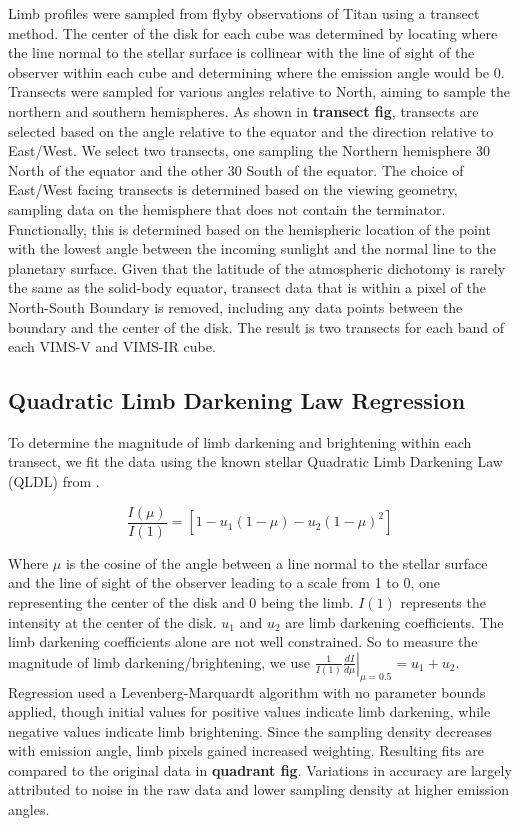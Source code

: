 \documentclass[tighten,linenumbers,twocolumn]{aastex631}
\begin{document}
Limb profiles were sampled from flyby observations of Titan using a transect method. The center of the disk for each cube was determined by locating where the line normal to the stellar surface is collinear with the line of sight of the observer within each cube and determining where the emission angle would be 0. Transects were sampled for various angles relative to North, aiming to sample the northern and southern hemispheres. As shown in \textbf{transect fig}, transects are selected based on the angle relative to the equator and the direction relative to East/West. We select two transects, one sampling the Northern hemisphere 30\textdegree{} North of the equator and the other 30\textdegree{} South of the equator. The choice of East/West facing transects is determined based on the viewing geometry, sampling data on the hemisphere that does not contain the terminator. Functionally, this is determined based on the hemispheric location of the point with the lowest angle between the incoming sunlight and the normal line to the planetary surface. Given that the latitude of the atmospheric dichotomy is rarely the same as the solid-body equator, transect data that is within a pixel of the North-South Boundary is removed, including any data points between the boundary and the center of the disk. The result is two transects for each band of each VIMS-V and VIMS-IR cube.


\subsection{Quadratic Limb Darkening Law Regression}

To determine the magnitude of limb darkening and brightening within each transect, we fit the data using the known stellar Quadratic Limb Darkening Law (QLDL) from \cite{kopal1950limb, brown2001hubble}. 

\begin{equation}
    \frac{I(\mu)}{I(1)} = \left[1 - u_{1}(1 - \mu) - u_{2}(1 - \mu)^2\right]
\end{equation}

Where $\mu$ is the cosine of the angle between a line normal to the stellar surface and the line of sight of the observer leading to a scale from 1 to 0, one representing the center of the disk and 0 being the limb. $I(1)$ represents the intensity at the center of the disk. $u_{1}$ and $u_{2}$ are limb darkening coefficients. The limb darkening coefficients alone are not well constrained. So to measure the magnitude of limb darkening/brightening, we use $\left.\frac{1}{I(1)}\frac{dI}{d\mu}\right|_{\mu=0.5} = u_{1} + u_{2}$. Regression used a Levenberg-Marquardt algorithm with no parameter bounds applied, though initial values for positive values indicate limb darkening, while negative values indicate limb brightening. Since the sampling density decreases with emission angle, limb pixels gained increased weighting. Resulting fits are compared to the original data in \textbf{quadrant fig}. Variations in accuracy are largely attributed to noise in the raw data and lower sampling density at higher emission angles.
\end{document}
